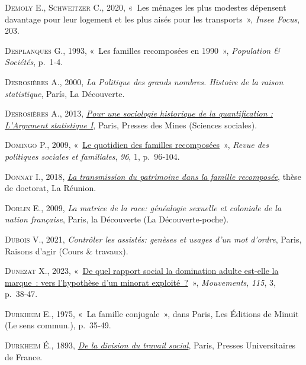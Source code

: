 \documentclass[
  12pt,
]{book}
\newlength{\cslhangindent}
\newenvironment{CSLReferences}[2] %
 {\begin{list}{}{%
  \setlength{\itemindent}{0pt}
  \setlength{\leftmargin}{0pt}
  \setlength{\parsep}{0pt}
  \ifodd #1
   \setlength{\leftmargin}{\cslhangindent}
   \setlength{\itemindent}{-1\cslhangindent}
  \fi
  \setlength{\itemsep}{#2\baselineskip}}}
 {\end{list}}
\begin{document}
\begin{CSLReferences}{0}{1}
\textsc{Demoly E.}, \textsc{Schweitzer C.}, 2020, {«~Les ménages les
plus modestes dépensent davantage pour leur logement et les plus aisés
pour les transports~»}, \emph{Insee Focus}, 203.

\textsc{Desplanques G.}, 1993, {«~Les familles recomposées en 1990~»},
\emph{Population \& Sociétés}, p.~1‑4.

\textsc{Desrosières A.}, 2000, \emph{La Politique des grands nombres.
Histoire de la raison statistique}, París, La Découverte.

\textsc{Desrosières A.}, 2013,
\emph{\href{http://books.openedition.org/pressesmines/901}{Pour une
sociologie historique de la quantification : L{'}Argument statistique
I}}, Paris, Presses des Mines (Sciences sociales).

\textsc{Domingo P.}, 2009,
{«~\href{https://doi.org/10.3406/caf.2009.2462}{Le quotidien des
familles recomposées}~»}, \emph{Revue des politiques sociales et
familiales}, \emph{96}, 1, p.~96‑104.

\textsc{Donnat I.}, 2018,
\emph{\href{http://www.theses.fr/2018LARE0021}{La transmission du
patrimoine dans la famille recomposée}}, thèse de doctorat, La Réunion.

\textsc{Dorlin E.}, 2009, \emph{La matrice de la race: généalogie
sexuelle et coloniale de la nation française}, Paris, la Découverte (La
Découverte-poche).

\textsc{Dubois V.}, 2021, \emph{Contrôler les assistés: genèses et
usages d'un mot d'ordre}, Paris, Raisons d'agir (Cours \& travaux).

\textsc{Dunezat X.}, 2023,
{«~\href{https://doi.org/10.3917/mouv.115.0038}{De quel rapport social
la domination adulte est-elle la marque~: vers l{'}hypothèse d{'}un
minorat exploité~?}~»}, \emph{Mouvements}, \emph{115}, 3, p.~38‑47.

\textsc{Durkheim E.}, 1975, {«~La famille conjugale~»}, dans Paris, Les
Éditions de Minuit (Le sens commun.), p.~35‑49.

\textsc{Durkheim É.}, 1893,
\emph{\href{https://www.cairn.info/de-la-division-du-travail-social--9782130619574.htm}{De
la division du travail social}}, Paris, Presses Universitaires de
France.


\end{CSLReferences}
\end{document}
